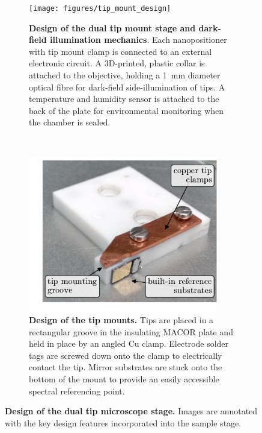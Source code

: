 \documentclass{article}
\begin{document}
\begin{figure}[bt]
\centering
\begin{subfigure}[t]{0.54\textwidth}
	\centering
	\texttt{[image: figures/tip\_mount\_design]}
	\caption[Design of the dual tip mount stage and dark-field illumination mechanics]{\textbf{Design of the dual tip mount stage and dark-field illumination mechanics}. Each nanopositioner with tip mount clamp is connected to an external electronic circuit. A 3D-printed, plastic collar is attached to the objective, holding a \SI{1}{mm} diameter optical fibre for dark-field side-illumination of tips. A temperature and humidity sensor is attached to the back of the plate for environmental monitoring when the chamber is sealed.}
	\label{fig:tip_mount_design}
\end{subfigure}
~
\begin{subfigure}[t]{0.43\textwidth}
	\centering
	\includegraphics[width=0.91\textwidth, clip=true, trim=15 10 0 0]{figures/tip_mount}
	\caption[Design of the tip mounts]{\textbf{Design of the tip mounts.} Tips are placed in a rectangular groove in the insulating MACOR plate and held in place by an angled Cu clamp. Electrode solder tags are screwed down onto the clamp to electrically contact the tip. Mirror substrates are stuck onto the bottom of the mount to provide an easily accessible spectral referencing point.}
	\label{fig:tip_mount}
\end{subfigure}
\caption[Design of the dual tip microscope stage]{\textbf{Design of the dual tip microscope stage.} Images are annotated with the key design features incorporated into the sample stage.}
\end{figure}
\end{document}
